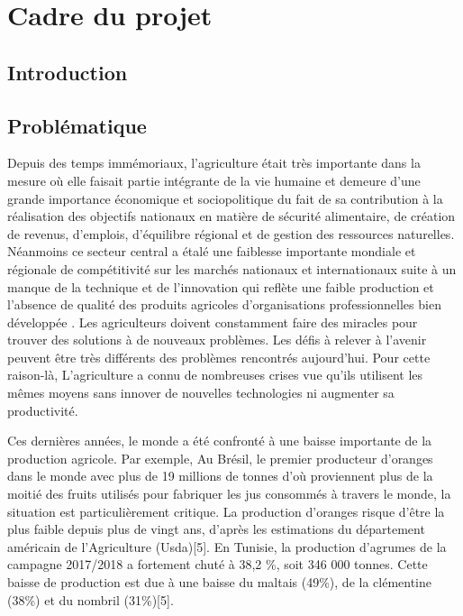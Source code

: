 
	\chapter{Cadre du projet }
	\newpage
	
	
	\section{Introduction }

	
	\section{Problématique }
	Depuis des temps immémoriaux, l'agriculture était très importante dans la mesure où elle faisait partie intégrante de la vie humaine et demeure d’une grande importance économique et sociopolitique du fait de sa contribution à la réalisation des objectifs nationaux en matière de sécurité alimentaire, de création de revenus, d’emplois, d’équilibre régional et de gestion des ressources naturelles. Néanmoins ce secteur central a étalé une faiblesse importante mondiale et régionale de compétitivité sur les marchés nationaux et internationaux suite à un manque de la technique et de l'innovation qui reflète une faible production et l'absence de qualité des produits agricoles d'organisations professionnelles bien développée . Les agriculteurs doivent constamment faire des miracles pour trouver des solutions à de nouveaux problèmes. Les défis à relever à l'avenir peuvent être très différents des problèmes rencontrés aujourd’hui. Pour cette raison-là, L'agriculture a connu de nombreuses crises vue qu’ils utilisent les mêmes moyens sans innover de nouvelles technologies ni augmenter sa productivité.
	
	Ces dernières années, le monde a été confronté à une baisse importante de la production agricole. Par exemple, Au Brésil, le premier producteur d’oranges dans le monde avec plus de 19 millions de tonnes d'où proviennent plus de la moitié des fruits utilisés pour fabriquer les jus consommés à travers le monde, la situation est particulièrement critique. La production d'oranges risque d'être la plus faible depuis plus de vingt ans, d'après les estimations du département américain de l'Agriculture (Usda)[5]. En Tunisie, la production d'agrumes de la campagne 2017/2018 a fortement chuté à 38,2 \%, soit 346 000 tonnes. Cette baisse de production est due à une baisse du maltais (49\%), de la clémentine (38\%) et du nombril (31\%)[5].
	
